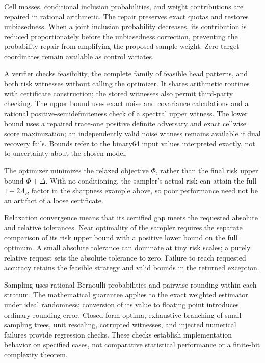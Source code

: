 \documentclass[11pt]{article}
\begin{document}
Cell masses, conditional inclusion probabilities, and weight
contributions are repaired in rational arithmetic. The repair preserves
exact quotas and restores unbiasedness. When a joint inclusion
probability decreases, its contribution is reduced proportionately
before the unbiasedness correction, preventing the probability repair
from amplifying the proposed sample weight. Zero-target coordinates
remain available as control variates.

A verifier checks feasibility, the complete family of feasible head
patterns, and both risk witnesses without calling the optimizer. It
shares arithmetic routines with certificate construction; the stored
witnesses also permit third-party checking. The upper bound uses
exact noise and covariance calculations and a rational
positive-semidefiniteness check of a spectral upper witness. The lower
bound uses a repaired trace-one positive definite adversary and exact
cellwise score maximization; an independently valid noise witness
remains available if dual recovery fails. Bounds refer to the binary64
input values interpreted exactly, not to uncertainty about the chosen
model.

The optimizer minimizes the relaxed objective \(\Phi\), rather than the
final risk upper bound \(\Phi+\Delta\). With no conditioning, the sampler's
actual risk can attain the full \(1+2\Lambda_B\) factor in the sharpness
example above, so poor performance need not be an artifact of a loose
certificate.

Relaxation convergence means that its certified gap meets the requested
absolute and relative tolerances. Near optimality of the sampler
requires the separate comparison of its risk upper bound with a positive
lower bound on the full optimum. A small absolute tolerance can dominate
at tiny risk scales; a purely relative request sets the absolute
tolerance to zero. Failure to reach requested accuracy retains the
feasible strategy and valid bounds in the returned exception.

Sampling uses rational Bernoulli probabilities and pairwise rounding
within each stratum. The mathematical guarantee applies to the exact
weighted estimator under ideal randomness; conversion of its value to
floating point introduces ordinary rounding error. Closed-form optima,
exhaustive branching of small sampling trees, unit rescaling, corrupted
witnesses, and injected numerical failures provide regression checks.
These checks establish implementation behavior on specified cases, not
comparative statistical performance or a finite-bit complexity theorem.
\end{document}
